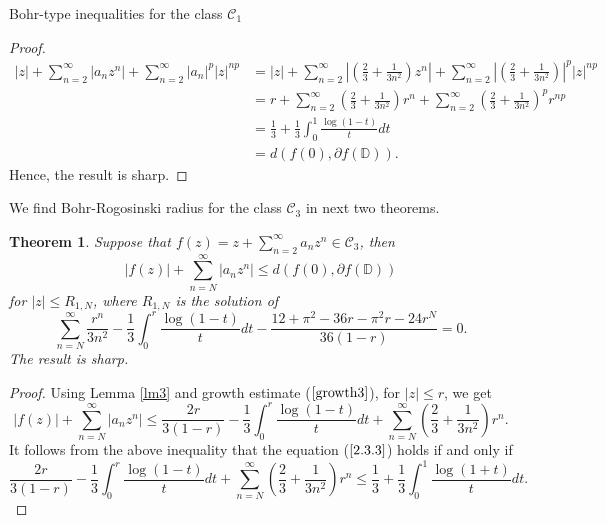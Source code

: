 \documentclass[12pt,a4paper,reqno]{amsart}
\theoremstyle{definition}
\theoremstyle{plain}
\newtheorem{theorem}[definition]{Theorem}
\numberwithin{equation}{section}
\begin{document}
\begin{section}{Bohr-type inequalities for the class $\mathcal{C}_1$}
\begin{proof}
\begin{align*}
|z|+ \sum_{n=2}^{\infty} |a_n z^n| + \sum_{n=2}^{\infty} |a_n|^{p} |z|^{np}
&=|z|+ \sum_{n=2}^{\infty} \left|\left( \frac{2}{3} + \frac{1}{3 n^2} \right) z^n\right| + \sum_{n=2}^{\infty} \left|\left( \frac{2}{3} + \frac{1}{3 n^2} \right)\right|^{p} |z|^{np}\\
&=r+ \sum_{n=2}^{\infty} \left( \frac{2}{3} + \frac{1}{3 n^2} \right) r^n + \sum_{n=2}^{\infty} \left( \frac{2}{3} + \frac{1}{3 n^2} \right)^{p} r^{np}\\
&= \frac{1}{3} + \frac{1}{3} \int_{0}^{1} \frac{\log(1-t)}{t} dt\\
&=d(f(0), \partial{f(\mathbb{D})}).
\end{align*}
Hence, the result is sharp.
\end{proof}
\noindent
We find Bohr-Rogosinski radius for the class $\mathcal{C}_3$ in next two theorems.
\begin{theorem}
Suppose that $f(z)=z + \sum_{n=2}^{\infty} a_n z^n \in \mathcal{C}_3$, then
\begin{equation} \label{2.3.3}
|f(z)|+ \sum_{n=N}^{\infty} |a_n z^n|  \le d(f(0), \partial{f(\mathbb{D})})
\end{equation}
for $|z| \le R_{1,N}$, where $R_{1,N}$ is the solution of
\begin{equation*}
 \sum_{n=N}^{\infty}   \frac{r^{n}}{3n^2} -\frac{1}{3} \int_{0}^{r} \frac{\log(1-t)}{t} dt- \frac{12+\pi ^2-36 r-\pi ^2 r-24 r^N}{36 (1-r)}=0.
\end{equation*}
The result is sharp.
\end{theorem}
\begin{proof}
Using Lemma \ref{lm3} and growth estimate  ($\ref{growth3}$), for $|z| \le r$, we get
\begin{equation*}
|f(z)|+ \sum_{n=N}^{\infty} |a_n z^n|  \le \frac{2r}{3(1-r)}-\frac{1}{3} \int_{0}^{r} \frac{\log(1-t)}{t} dt+ \sum_{n=N}^{\infty} \left( \frac{2}{3} + \frac{1}{3n^2} \right) r^{n}.
\end{equation*}
It follows from  the above inequality that the  equation ($\ref{2.3.3}$) holds if and only if
\begin{equation*}
\frac{2r}{3(1-r)}-\frac{1}{3} \int_{0}^{r} \frac{\log(1-t)}{t} dt+ \sum_{n=N}^{\infty} \left( \frac{2}{3} + \frac{1}{3n^2} \right) r^{n} \le  \frac{1}{3} +\frac{1}{3} \int_{0}^{1} \frac{\log(1+t)}{t} dt.

\end{equation*}
\end{proof}
\end{section}
\end{document}
